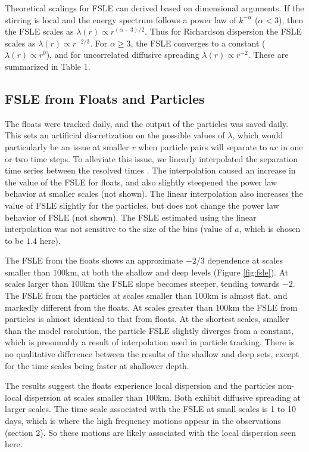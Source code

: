 \documentclass[]{ametsoc}
\begin{document}
Theoretical scalings for FSLE can derived based on dimensional arguments. If the stirring is local and the energy spectrum follows a power law of $k^{-\alpha}$ ($\alpha<3$), then the FSLE scales as $\lambda(r) \propto r^{(\alpha-3)/2}$. Thus for Richardson dispersion the FSLE scales as $\lambda(r) \propto r^{-2/3}$. For $\alpha \geq 3$, the FSLE converges to a constant ($\lambda(r) \propto r^{0}$), and for uncorrelated diffusive spreading $\lambda(r) \propto r^{-2}$. These are summarized in Table 1.

\subsection{FSLE from Floats and Particles}
The floats were tracked daily, and the output of the particles was saved daily. This sets an artificial discretization on the possible values of $\lambda$, which would particularly be an issue at smaller $r$ when particle pairs will separate to $ar$ in one or two time steps. To alleviate this issue, we linearly interpolated the separation time series between the resolved times \citep{lacasce2008statistics,lumpkin2010surface, haza2014does}. The interpolation caused an increase in the value of the FSLE for floats, and also slightly steepened the power law behavior at smaller scales (not shown). The linear interpolation also increases the value of FSLE slightly for the particles, but does not change the power law behavior of FSLE (not shown). The FSLE estimated using the linear interpolation was not sensitive to the size of the bins (value of $a$, which is chosen to be $1.4$ here). 

The FSLE from the floats shows an approximate $-2/3$ dependence at scales smaller than $100$km, at both the shallow and deep levels (Figure \ref{fig:fsle}). At scales larger than $100$km the FSLE slope becomes steeper, tending towards $-2$. The FSLE from the particles at scales smaller than $100$km is almost flat, and markedly different from the floats. At scales greater than $100$km the FSLE from particles is almost identical to that from floats. At the shortest scales, smaller than the model resolution, the particle FSLE slightly diverges from a constant, which is presumably a result of interpolation used in particle tracking. There is no qualitative difference between the results of the shallow and deep sets, except for the time scales being faster at shallower depth.

The results suggest the floats experience local dispersion and the particles non-local dispersion 
at scales smaller than 100km. Both exhibit diffusive spreading at larger scales. The time scale associated with the FSLE at small scales is 1 to 10 days, which is where the high frequency motions appear in the observations (section 2). 
So these motions are likely associated with the local dispersion seen here. 
\end{document}
